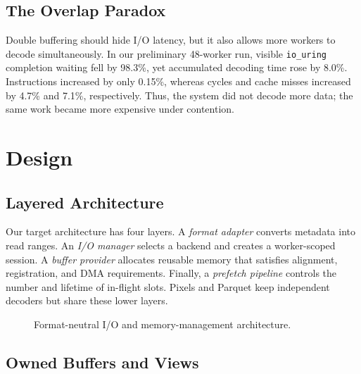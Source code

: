\documentclass[conference]{IEEEtran}
\begin{document}
\subsection{The Overlap Paradox}

Double buffering should hide I/O latency, but it also allows more workers to
decode simultaneously.  In our preliminary 48-worker run, visible
\texttt{io\_uring} completion waiting fell by 98.3\%, yet accumulated decoding
time rose by 8.0\%.  Instructions increased by only 0.15\%, whereas cycles and
cache misses increased by 4.7\% and 7.1\%, respectively.  Thus, the system did
not decode more data; the same work became more expensive under contention.

\section{Design}

\subsection{Layered Architecture}

Our target architecture has four layers.  A \emph{format adapter} converts
metadata into read ranges.  An \emph{I/O manager} selects a backend and creates
a worker-scoped session.  A \emph{buffer provider} allocates reusable memory
that satisfies alignment, registration, and DMA requirements.  Finally, a
\emph{prefetch pipeline} controls the number and lifetime of in-flight slots.
Pixels and Parquet keep independent decoders but share these lower layers.

\begin{figure}[t]
\centering
{}
\caption{Format-neutral I/O and memory-management architecture.}
\label{fig:architecture}
\end{figure}

\subsection{Owned Buffers and Views}
\end{document}
